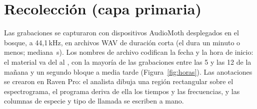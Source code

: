 \documentclass[12pt,a4paper]{article}
\begin{document}
\section{Recolección (capa primaria)}

Las grabaciones se capturaron con dispositivos AudioMoth desplegados en el bosque, a 44,1\,kHz,
en archivos WAV de duración corta (el \pctShortRecordings{} dura un minuto o menos; mediana
\medianRecordingS{}\,s). Los nombres de archivo codifican la fecha y la hora de inicio: el
material va del \firstDate{} al \lastDate{}, con la mayoría de las grabaciones entre las 5 y
las 12 de la mañana y un segundo bloque a media tarde (Figura~\ref{fig:horas}). Las anotaciones
se crearon en Raven Pro: el analista dibuja una región rectangular sobre el espectrograma, el
programa deriva de ella los tiempos y las frecuencias, y las columnas de especie y tipo de
llamada se escriben a mano.


\end{document}
